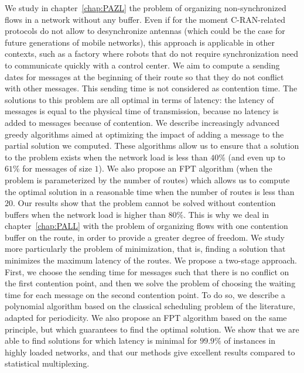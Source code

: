 We study in chapter~\ref{chap:PAZL} the problem of organizing non-synchronized flows in a network without any buffer.
Even if for the moment C-RAN-related protocols do not allow to desynchronize antennas (which could be the case for future generations of mobile networks), this approach is applicable in other contexts, such as a factory where robots that do not require synchronization need to communicate quickly with a control center.
We aim to compute a sending dates for messages at the beginning of their route so that they do not conflict with other messages. This sending time is not considered as contention time.
The solutions to this problem are all optimal in terms of latency: the latency of messages is equal to the physical time of transmission, because no latency is added to messages because of contention. We describe increasingly advanced greedy algorithms aimed at optimizing the impact of adding a message to the partial solution we computed. These algorithms allow us to ensure that a solution to the problem exists when the network load is less than $40\%$ (and even up to $61\%$ for messages of size $1$). We also propose an FPT algorithm (when the problem is parameterized by the number of routes) which allows us to compute the optimal solution in a reasonable time when the number of routes is less than $20$. Our results show that the problem cannot be solved without contention buffers when the network load is higher than $80\%$.
This is why we deal in chapter~\ref{chap:PALL} with the problem of organizing flows with one contention buffer on the route, in order to provide a greater degree of freedom. We study more particularly the problem of minimization, that is, finding a solution that minimizes the maximum latency of the routes. We propose a two-stage approach. First, we choose the sending time for messages such that there is no conflict on the first contention point, and then we solve the problem of choosing the waiting time for each message on the second contention point. To do so, we describe a polynomial algorithm based on the classical scheduling problem of the literature, adapted for periodicity. We also propose an FPT algorithm based on the same principle, but which guarantees to find the optimal solution. We show that we are able to find solutions for which latency is minimal for $99.9\%$ of instances in highly loaded networks, and that our methods give excellent results compared to statistical multiplexing.

